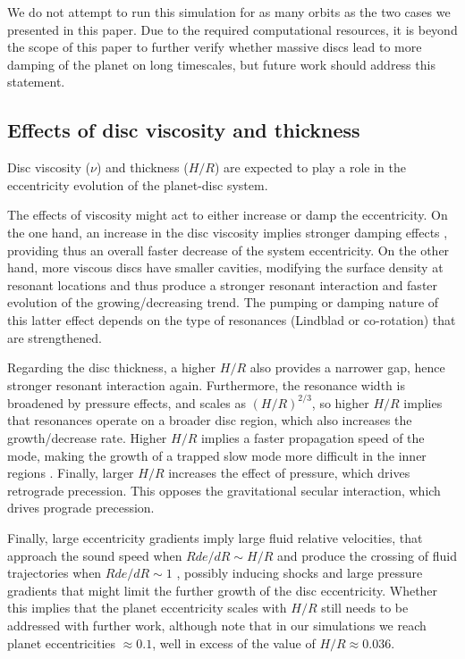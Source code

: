\documentclass[usenatbib,a4paper,times,fleqn]{mnras}
\begin{document}
We do not attempt to run this simulation for as many orbits as the two cases we presented in this paper. Due to the required computational resources, it is beyond the scope of this paper to further verify whether massive discs lead to more damping of the planet on long timescales, but future work should address this statement.

\subsection{Effects of disc viscosity and thickness}\label{discthickvisc}

Disc viscosity ($\nu$) and thickness ($H/R$) are expected to play a role in the eccentricity evolution of the planet-disc system. 

The effects of viscosity might act to either increase or damp the eccentricity. On the one hand, an increase in the disc viscosity implies stronger damping effects \citep{teyssandier2016}, providing thus an overall faster decrease of the system eccentricity. On the other hand, more viscous discs have smaller cavities, modifying the surface density at resonant locations and thus produce a stronger resonant interaction and faster evolution of the growing/decreasing trend. The pumping or damping nature of this latter effect depends on the type of resonances (Lindblad or co-rotation) that are strengthened. 

Regarding the disc thickness, a higher $H/R$ also provides a narrower gap, hence stronger resonant interaction again. Furthermore, the resonance width is broadened by pressure effects, and scales as $(H/R)^{2/3}$, so higher $H/R$ implies that resonances operate on a broader disc region, which also increases the growth/decrease rate. Higher $H/R$ implies a faster propagation speed of the mode, making the growth of a trapped slow mode more difficult in the inner regions \citep{teyssandier2016}. Finally, larger $H/R$ increases the effect of pressure, which drives retrograde precession. This opposes the gravitational secular interaction, which drives prograde precession. 

Finally, large eccentricity gradients imply large fluid relative velocities, that approach the sound speed when $Rde/dR \sim H/R$ and produce the crossing of fluid trajectories when $Rde/dR \sim 1$ \citep{ogilvie2001}, possibly inducing shocks and large pressure gradients that might limit the further growth of the disc eccentricity. Whether this implies that the planet eccentricity scales with $H/R$ \citep{duffell2015} still needs to be addressed with further work, although note that in our simulations we reach planet eccentricities $\approx 0.1$, well in excess of the value of $H/R\approx 0.036$.
\end{document}
